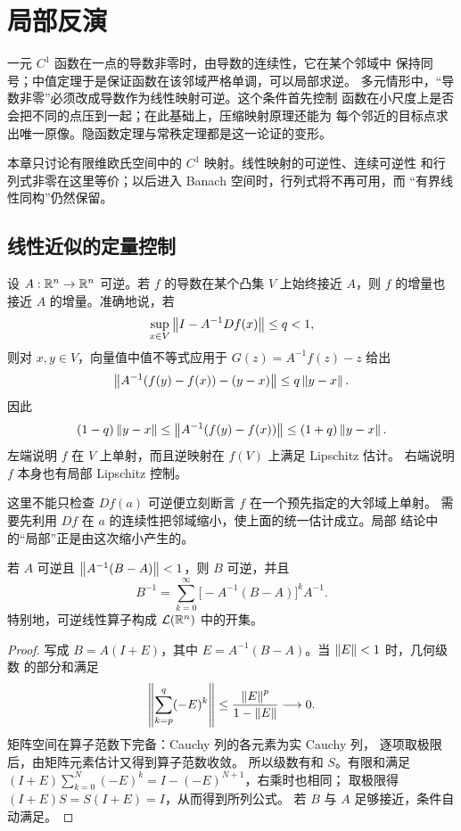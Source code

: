 \chapter{局部反演}
\label{chap:local-inversion}

一元 \(C^1\) 函数在一点的导数非零时，由导数的连续性，它在某个邻域中
保持同号；中值定理于是保证函数在该邻域严格单调，可以局部求逆。
多元情形中，“导数非零”必须改成导数作为线性映射可逆。这个条件首先控制
函数在小尺度上是否会把不同的点压到一起；在此基础上，压缩映射原理还能为
每个邻近的目标点求出唯一原像。隐函数定理与常秩定理都是这一论证的变形。

本章只讨论有限维欧氏空间中的 $C^1$ 映射。线性映射的可逆性、连续可逆性
和行列式非零在这里等价；以后进入 Banach 空间时，行列式将不再可用，而
“有界线性同构”仍然保留。

\section{线性近似的定量控制}

设 $A:\mathbb{R}^n\to\mathbb{R}^n$ 可逆。若 $f$ 的导数在某个凸集 $V$ 上始终接近
$A$，则 $f$ 的增量也接近 $A$ 的增量。准确地说，若
\[
 \sup_{x\in V}\left\lVert I-A^{-1}Df(x)\right\rVert\le q<1,
\]
则对 $x,y\in V$，向量值中值不等式应用于
$G(z)=A^{-1}f(z)-z$ 给出
\[
 \left\lVert A^{-1}(f(y)-f(x))-(y-x)\right\rVert\le q\left\lVert y-x\right\rVert.
\]
因此
\begin{equation}
 (1-q)\left\lVert y-x\right\rVert
 \le \left\lVert A^{-1}(f(y)-f(x))\right\rVert
 \le (1+q)\left\lVert y-x\right\rVert.
 \label{eq:quantitative-local-injectivity}
\end{equation}
左端说明 $f$ 在 $V$ 上单射，而且逆映射在 $f(V)$ 上满足 Lipschitz 估计。
右端说明 $f$ 本身也有局部 Lipschitz 控制。

这里不能只检查 $Df(a)$ 可逆便立刻断言 $f$ 在一个预先指定的大邻域上单射。
需要先利用 $Df$ 在 $a$ 的连续性把邻域缩小，使上面的统一估计成立。局部
结论中的“局部”正是由这次缩小产生的。

\begin{proposition}[线性算子的稳定可逆性]
\label{prop:linear-invertibility-stability}
若 $A$ 可逆且 $\left\lVert A^{-1}(B-A)\right\rVert<1$，则 $B$ 可逆，并且
\[
 B^{-1}=\sum_{k=0}^{\infty}
 \bigl[-A^{-1}(B-A)\bigr]^kA^{-1}.
\]
特别地，可逆线性算子构成 $\mathcal L(\mathbb{R}^n)$ 中的开集。
\end{proposition}

\begin{proof}
写成 $B=A(I+E)$，其中 $E=A^{-1}(B-A)$。当 $\left\lVert E\right\rVert<1$ 时，几何级数
的部分和满足
\[
 \left\|\sum_{k=p}^q(-E)^k\right\|
 \le\frac{\left\lVert E\right\rVert^p}{1-\left\lVert E\right\rVert}\longrightarrow0.
\]
矩阵空间在算子范数下完备：Cauchy 列的各元素为实 Cauchy 列，
逐项取极限后，由矩阵元素估计又得到算子范数收敛。
所以级数有和 \(S\)。有限和满足
\((I+E)\sum_{k=0}^N(-E)^k=I-(-E)^{N+1}\)，右乘时也相同；
取极限得 \((I+E)S=S(I+E)=I\)，从而得到所列公式。
若 $B$ 与 $A$ 足够接近，条件自动满足。
\end{proof}

